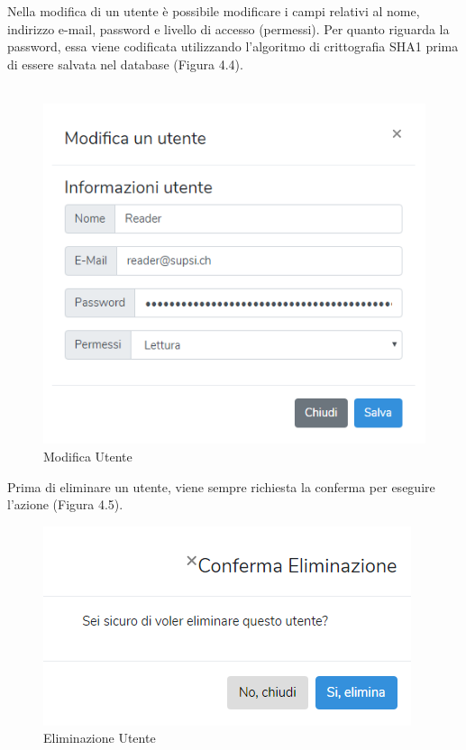 \documentclass[twoside]{supsistudent}
\begin{document}
Nella modifica di un utente è possibile modificare i campi relativi al nome, indirizzo e-mail, password e livello di accesso (permessi). Per quanto riguarda la password, essa viene codificata utilizzando l'algoritmo di crittografia SHA1 prima di essere salvata nel database (Figura 4.4).\\\\
\begin{figure}[!h]
\centering
\includegraphics[scale=0.6]{saniwiki_modificautente.png}
\caption{Modifica Utente}
\end{figure}
Prima di eliminare un utente, viene sempre richiesta la conferma per eseguire l'azione (Figura 4.5).
\begin{figure}[!h]
\centering
\includegraphics[scale=0.6]{saniwiki_eliminautente.png}
\caption{Eliminazione Utente}
\end{figure}
\end{document}
